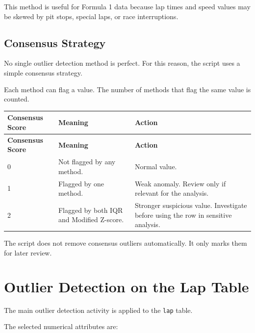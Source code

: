 \documentclass[a4paper,11pt]{article}
\begin{document}
	This method is useful for Formula 1 data because lap times and speed values may be skewed by pit stops, special laps, or race interruptions.
	
	\subsection{Consensus Strategy}
	
	No single outlier detection method is perfect.
	For this reason, the script uses a simple consensus strategy.
	
	Each method can flag a value.
	The number of methods that flag the same value is counted.
	
	\begin{longtable}{p{3cm}p{5cm}p{6cm}}
		\toprule
		\textbf{Consensus Score} & \textbf{Meaning} & \textbf{Action} \\
		\midrule
		\endfirsthead
		
		\toprule
		\textbf{Consensus Score} & \textbf{Meaning} & \textbf{Action} \\
		\midrule
		\endhead
		
		0
		& Not flagged by any method.
		& Normal value. \\
		\midrule
		
		1
		& Flagged by one method.
		& Weak anomaly. Review only if relevant for the analysis. \\
		\midrule
		
		2
		& Flagged by both IQR and Modified Z-score.
		& Stronger suspicious value. Investigate before using the row in sensitive analysis. \\
		\bottomrule
	\end{longtable}
	
	The script does not remove consensus outliers automatically.
	It only marks them for later review.
	
	
	\section{Outlier Detection on the Lap Table}
	
	The main outlier detection activity is applied to the \texttt{lap} table.
	
	The selected numerical attributes are:
	
\end{document}
